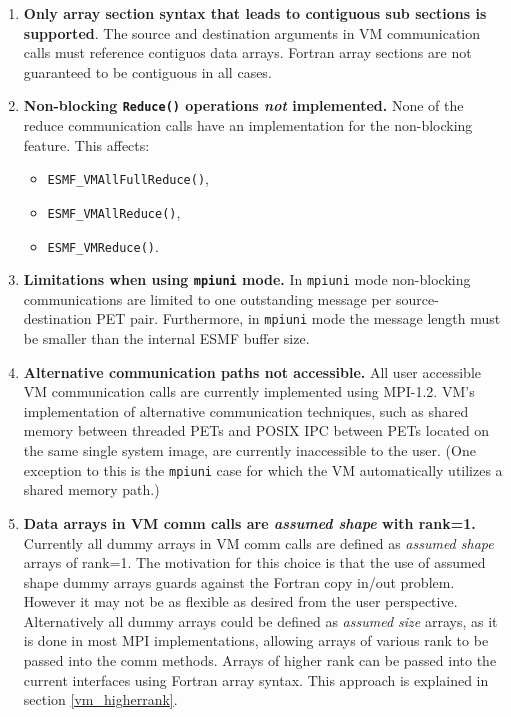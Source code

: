 

\begin{enumerate}

\item {\bf Only array section syntax that leads to contiguous sub sections is supported}. The source and destination arguments in VM communication calls must reference contiguos data arrays. Fortran array sections are not guaranteed to be contiguous in all cases.

\item {\bf Non-blocking {\tt Reduce()} operations {\em not} implemented.} None of the reduce communication calls have an implementation for the non-blocking feature. This affects:
\begin{itemize}
\item {\tt ESMF\_VMAllFullReduce()},
\item {\tt ESMF\_VMAllReduce()},
\item {\tt ESMF\_VMReduce()}.
\end{itemize}

\item {\bf Limitations when using {\tt mpiuni} mode.} In {\tt mpiuni} mode non-blocking communications are limited to one outstanding message per source-destination PET pair. Furthermore, in {\tt mpiuni} mode the message length must be smaller than the internal ESMF buffer size.

\item {\bf Alternative communication paths not accessible.} All user accessible VM communication calls are currently implemented using MPI-1.2. VM's implementation of alternative communication techniques, such as shared memory between threaded PETs and POSIX IPC between PETs located on the same single system image, are currently inaccessible to the user. (One exception to this is the {\tt mpiuni} case for which the VM automatically utilizes a shared memory path.)

\item {\bf Data arrays in VM comm calls are {\em assumed shape} with rank=1.} Currently all dummy arrays in VM comm calls are defined as {\em assumed shape} arrays of rank=1. The motivation for this choice is that the use of assumed shape dummy arrays guards against the Fortran copy in/out problem. However it may not be as flexible as desired from the user perspective. Alternatively all dummy arrays could be defined as {\em assumed size} arrays, as it is done in most MPI implementations, allowing arrays of various rank to be passed into the comm methods. Arrays of higher rank can be passed into the current interfaces using Fortran array syntax. This approach is explained in section \ref{vm_higherrank}.

\end{enumerate}


